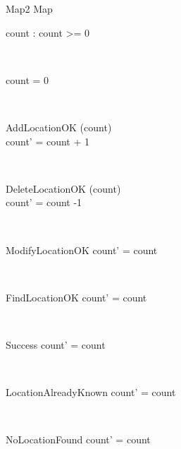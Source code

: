 \documentclass[12pt]{article}
\begin{document}
\begin{spacing}{1.5}
\begin{class}{Map2}
\also
Map \\
\begin{state}
count : 
\where
count >= 0
\end{state} \\
\begin{init}
count = 0
\end{init} \\
\begin{op}{AddLocationOK}
\Delta (count) \\
\ST
count' = count + 1
\end{op}\\
\begin{op}{DeleteLocationOK}
\Delta (count) \\
\ST
count' = count -1
\end{op}\\
\begin{op}{ModifyLocationOK}
\ST
count' = count
\end{op}\\ 
\begin{op}{FindLocationOK}
\ST
count' = count
\end{op}\\
\begin{op}{Success}
\ST
count' = count
\end{op}\\
\begin{op}{LocationAlreadyKnown}
\ST
count' = count
\end{op}\\ 
\begin{op}{NoLocationFound}
\ST
count' = count
\end{op}\\
\end{class}




\end{spacing}
\end{document}
